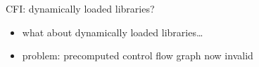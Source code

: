 \begin{frame}{CFI: dynamically loaded libraries?}
    \begin{itemize}
    \item what about dynamically loaded libraries\ldots
    \item problem: precomputed control flow graph now invalid
    \end{itemize}
\end{frame}
